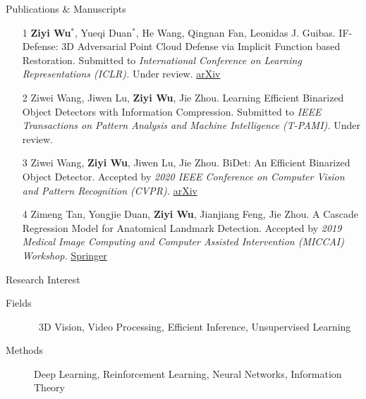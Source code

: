 \documentclass{resume} %
\begin{document}
\begin{rSection}{Publications \& Manuscripts}

\begin{enumerate}
\item[1] \textbf{Ziyi Wu}$^{*}$, Yueqi Duan$^{*}$, He Wang, Qingnan Fan, Leonidas J. Guibas. IF-Defense: 3D Adversarial Point Cloud Defense via Implicit Function based Restoration. Submitted to \textit{International Conference on Learning Representations (ICLR).} Under review. \href{https://arxiv.org/abs/2010.05272}{arXiv}
\item[2] Ziwei Wang, Jiwen Lu, \textbf{Ziyi Wu}, Jie Zhou. Learning Efficient Binarized Object Detectors with Information Compression. Submitted to \textit{IEEE Transactions on Pattern Analysis and Machine Intelligence (T-PAMI).} Under review.
\item[3] Ziwei Wang, \textbf{Ziyi Wu}, Jiwen Lu, Jie Zhou. BiDet: An Efficient Binarized Object Detector. Accepted by \textit{2020 IEEE Conference on Computer Vision and Pattern Recognition (CVPR).} \href{https://arxiv.org/abs/2003.03961}{arXiv}
\item[4] Zimeng Tan, Yongjie Duan, \textbf{Ziyi Wu}, Jianjiang Feng, Jie Zhou. A Cascade Regression Model for Anatomical Landmark Detection. Accepted by \textit{2019 Medical Image Computing and Computer Assisted Intervention (MICCAI) Workshop.} \href{https://link.springer.com/chapter/10.1007/978-3-030-39074-7_5}{Springer}
\end{enumerate}

\end{rSection}

\begin{rSection}{Research Interest}

\begin{description}
    \item[Fields] \quad\quad\, 
    3D Vision, 
    Video Processing, 
    Efficient Inference, 
    Unsupervised Learning
    \item[Methods] \quad Deep Learning, Reinforcement Learning, Neural Networks, Information Theory
    \newline
\end{description}

\end{rSection}
\end{document}
